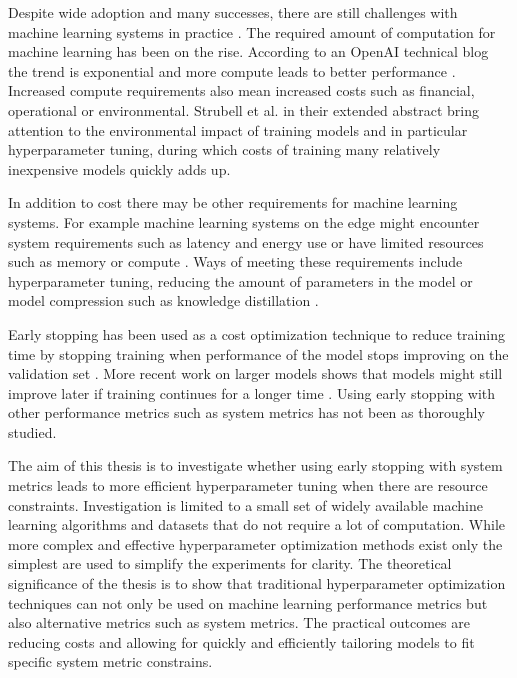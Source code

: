 Despite wide adoption and many successes, there are still challenges with machine learning systems in practice . The required amount of computation for machine learning has been on the rise. According to an OpenAI technical blog the trend is exponential and more compute leads to better performance \parencite{amodeiAICompute2018}. Increased compute requirements also mean increased costs such as financial, operational or environmental. Strubell et al. \parencite*{strubellEnergyPolicyConsiderations2020} in their extended abstract bring attention to the environmental impact of training models and in particular hyperparameter tuning, during which costs of training many relatively inexpensive models quickly adds up.

In addition to cost there may be other requirements for machine learning systems. For example machine learning systems on the edge might encounter system requirements such as latency and energy use or have limited resources such as memory or compute \parencite{chenDeepLearningEdge2019}. Ways of meeting these requirements include hyperparameter tuning, reducing the amount of parameters in the model or model compression such as knowledge distillation \parencite{chenDeepLearningEdge2019}.

Early stopping has been used as a cost optimization technique to reduce training time by stopping training when performance of the model stops improving on the validation set \parencite{precheltAutomaticEarlyStopping1998}. More recent work on larger models shows that models might still improve later if training continues for a longer time \parencite{hofferTrainLongerGeneralize2018}. Using early stopping with other performance metrics such as system metrics has not been as thoroughly studied.


The aim of this thesis is to investigate whether using early stopping with system metrics leads to more efficient hyperparameter tuning when there are resource constraints. Investigation is limited to a small set of widely available machine learning algorithms and datasets that do not require a lot of computation. While more complex and effective hyperparameter optimization methods exist only the simplest are used to simplify the experiments for clarity. The theoretical significance of the thesis is to show that traditional hyperparameter optimization techniques can not only be used on machine learning performance metrics but also alternative metrics such as system metrics. The practical outcomes are reducing costs and allowing for quickly and efficiently tailoring models to fit specific system metric constrains.

